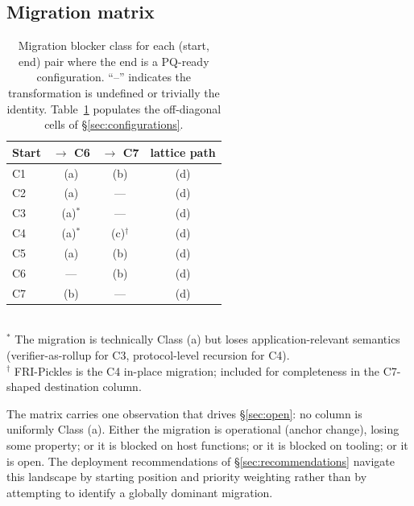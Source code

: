 \subsection{Migration matrix}
\label{sec:migration-matrix}

\begin{table}[t]
  \centering
  \caption{Migration blocker class for each (start, end) pair where
    the end is a PQ-ready configuration. ``--'' indicates the
    transformation is undefined or trivially the identity.
    Table~\ref{tab:migration} populates the off-diagonal cells of
    \S\ref{sec:configurations}.}
  \label{tab:migration}
  \begin{tabular}{lccc}
    \toprule
    Start & $\to$ C6 & $\to$ C7 & lattice path \\
    \midrule
    C1 & (a) & (b) & (d) \\
    C2 & (a) & ---  & (d) \\
    C3 & (a)$^\ast$ & --- & (d) \\
    C4 & (a)$^\ast$ & (c)$^\dagger$ & (d) \\
    C5 & (a) & (b) & (d) \\
    C6 & ---  & (b) & (d) \\
    C7 & (b) & ---  & (d) \\
    \bottomrule
  \end{tabular}
  \\[0.5em]
  \footnotesize
  $^\ast$ The migration is technically Class (a) but loses
    application-relevant semantics (verifier-as-rollup for C3,
    protocol-level recursion for C4). \\
  $^\dagger$ FRI-Pickles is the C4 in-place migration; included
    for completeness in the C7-shaped destination column.
\end{table}

The matrix carries one observation that drives \S\ref{sec:open}: no
column is uniformly Class (a). Either the migration is operational
(anchor change), losing some property; or it is blocked on host
functions; or it is blocked on tooling; or it is open. The
deployment recommendations of \S\ref{sec:recommendations} navigate
this landscape by starting position and priority weighting rather
than by attempting to identify a globally dominant migration.
